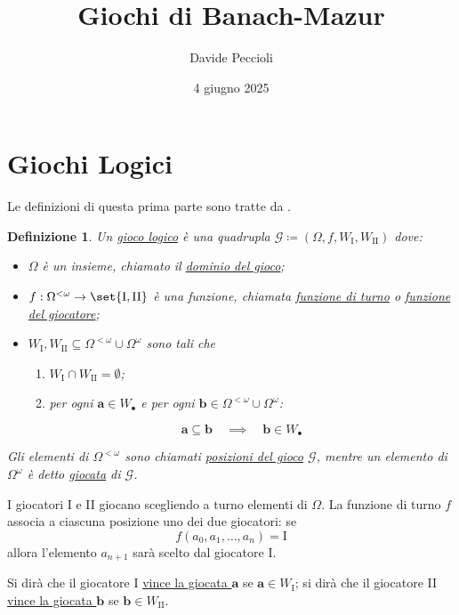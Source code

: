 \documentclass[titlepage]{article}
\author{Davide Peccioli}
\date{4 giugno 2025}
\title{Giochi di Banach-Mazur}
\newcommand{\1}{\mathds{1}}
\theoremstyle{definition}%
\theoremstyle{plain}
\newtheorem{defn}[thm]{Definizione}
\theoremstyle{remark}
\begin{document}
\maketitle
\tableofcontents
\cleardoublepage

\section{Giochi Logici}
\label{sec:org7949131}

Le definizioni di questa prima parte sono tratte da \cite{sep}.

\begin{defn}
Un \uline{gioco logico} è una quadrupla \(\mathcal{G} \coloneqq (\Omega, f, W_{\text{I}}, W_{\text{II}})\) dove:
\begin{itemize}
\item \(\Omega\) è un {insieme}, chiamato il \uline{dominio del gioco};
\item \(f:\Omega^{<\omega}\to \set{\text{I},\text{II}}\) è una {funzione}, chiamata \uline{funzione di turno} o \uline{funzione del giocatore};
\item \(W_{\text{I}},W_{\text{II}} \subseteq \Omega^{<\omega}\cup \Omega^{\omega}\) sono tali che
\begin{enumerate}
\item \(W_{\text{I}}\cap W_{\text{II}} = \emptyset\);
\item per ogni \(\bm{a} \in W_{\bullet}\) e per ogni \(\bm{b} \in\Omega^{<\omega}\cup \Omega^{\omega}\):
\end{enumerate}
\begin{equation*}
  \bm{a} \subseteq \bm{b}\quad\implies\quad \bm{b} \in W_{\bullet}
\end{equation*}
\end{itemize}

Gli elementi di \(\Omega^{<\omega}\) sono chiamati \uline{posizioni del gioco} \(\mathcal{G}\), mentre un elemento di \(\Omega^{\omega}\) è detto \uline{giocata} di \(\mathcal{G}\).
\end{defn}

I giocatori I e II giocano scegliendo a turno elementi di \(\Omega\). La funzione di turno \(f\) associa a ciascuna posizione uno dei due giocatori: se
\begin{equation*}
f(a_{0},a_{1},\dots,a_{n}) = \text{I}
\end{equation*}
allora l'elemento \(a_{n+1}\) sarà scelto dal giocatore I.

Si dirà che il giocatore I \uline{vince la giocata \(\bm{a}\)} se \(\bm{a} \in W_{\text{I}}\); si dirà che il giocatore II \uline{vince la giocata \(\bm{b}\)} se \(\bm{b} \in W_{\text{II}}\).
\end{document}
